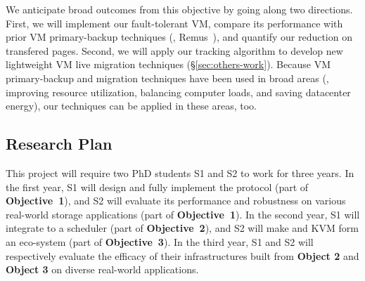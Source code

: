 
 We anticipate broad outcomes from this objective by 
going along two directions. First, we will implement our fault-tolerant VM, 
compare its performance with prior VM primary-backup techniques (\eg, 
Remus~\cite{remus:nsdi08}), and quantify our reduction on transfered pages. 
Second, we will apply our tracking algorithm to develop new lightweight VM 
live migration techniques (\S\ref{sec:others-work}). Because VM primary-backup 
and migration techniques have been used in broad areas (\eg, improving resource 
utilization, balancing computer loads, and saving datacenter energy), our 
techniques can be applied in these areas, too.


% 

\vspace{-.15in}\subsection{Research Plan} \label{sec:plan}\vspace{-.075in}

This project will require two PhD students S1 and S2 to work for 
three years. In the first year, S1 will design and fully implement the \falcon 
protocol (part of \textbf{Objective~1}), and S2 will evaluate its performance 
and robustness on various real-world storage applications (part of 
\textbf{Objective~1}). In the second year, S1 will 
integrate \falcon to a scheduler \mesos (part of \textbf{Objective~2}), and S2 
will make \falcon and KVM form an eco-system (part of \textbf{Objective~3}). In 
the third year, S1 and S2 will respectively evaluate the efficacy of their 
infrastructures built from \textbf{Object 2} and \textbf{Object 3} on diverse
real-world applications.


